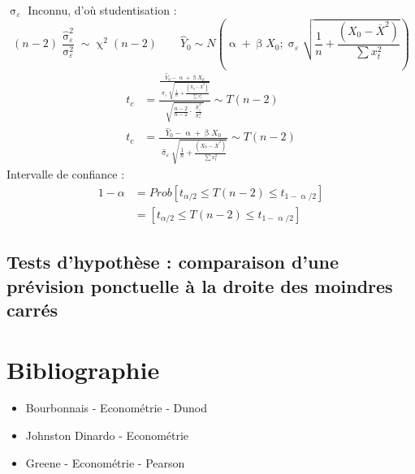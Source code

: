 \documentclass{article}
\newcommand{\sig}{\upsigma_\varepsilon^2}
\newcommand{\sige}{\hat{\upsigma}_\varepsilon^2}
\begin{document}
 $\upsigma_\varepsilon$ Inconnu, d'où studentisation :
 \begin{equation*}
 	(n-2) \frac{\sige}{\sig} \sim  \upchi^2 (n-2) \qquad \hat{Y}_0 \sim N \left(\upalpha + \upbeta X_0 ;  \upsigma_\varepsilon \sqrt{\frac{1}{n} + \frac{(X_0-\overline{X}^2)}{\sum x_t^2}}\right)
 \end{equation*}
 \begin{equation*}
 	\begin{split}
 	t_c &= \frac{\frac{\hat{Y}_0 - \upalpha + \upbeta X_0}{\upsigma_\varepsilon \sqrt{\frac{1}{n} + \frac{(X_0-\overline{X}^2)}{\sum x_t^2}}}}{\sqrt{\frac{n-2}{n-2} \cdot \frac{\sige}{\sig}}} \sim T(n-2) \\
 	t_c &=\frac{\hat{Y}_0 - \upalpha + \upbeta X_0}{\hat{\upsigma}_\varepsilon \sqrt{\frac{1}{n} + \frac{(X_0-\overline{X}^2)}{\sum x_t^2}}} \sim T(n-2)
 	\end{split}
 \end{equation*}
 Intervalle de confiance : 
 \begin{equation*}
 	\begin{split}
 	1 - \alpha &= Prob \left[t_{\alpha/2} \leq T(n-2) \leq t_{1-\upalpha/2}\right] \\
 	&= \left[t_{\alpha/2} \leq T(n-2) \leq t_{1-\upalpha/2}\right]
 	\end{split}
 \end{equation*}
 \subsection{Tests d'hypothèse : comparaison d'une prévision ponctuelle à la droite des moindres carrés}

\section{Bibliographie}
\begin{itemize}
    \item Bourbonnais - Econométrie - Dunod
    \item Johnston Dinardo - Econométrie
    \item Greene - Econométrie - Pearson 
\end{itemize}
\end{document}
